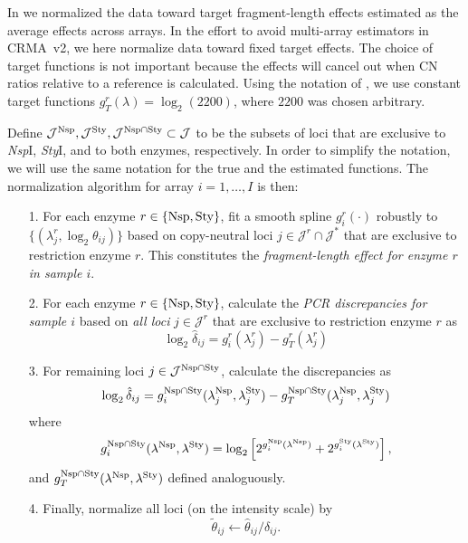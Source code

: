 \documentclass{bioinfo}
\newcommand{\NspI}{\emph{Nsp}I\xspace}
\newcommand{\StyI}{\emph{Sty}I\xspace}
\newcommand{\Nsp}{\ensuremath{\textnormal{Nsp}}\xspace}
\newcommand{\Sty}{\ensuremath{\textnormal{Sty}}\xspace}
\begin{document}
In \citet{BengtssonH_etal_2008a} we normalized the data toward target fragment-length effects estimated as the average effects across arrays.  
In the effort to avoid multi-array estimators in CRMA~v2, we here normalize data toward fixed target effects.  
The choice of target functions is not important because the effects will cancel out when CN ratios relative to a reference is calculated.
Using the notation of \citet{BengtssonH_etal_2008a}, we use constant target functions $g_T^r(\lambda) = \log_2(2200)$, where $2200$ was chosen arbitrary.

Define $\mathcal{J}^{\Nsp}, \mathcal{J}^{\Sty}, \mathcal{J}^{\Nsp\cap\Sty} \subset \mathcal{J}$ to be the subsets of loci that are exclusive to \NspI, \StyI, and to both enzymes, respectively.
In order to simplify the notation, we will use the same notation for the true and the estimated functions.  The normalization algorithm for array $i=1,\ldots,I$ is then:
\begin{enumerate}
 \item[1.] For each enzyme $r \in \{\Nsp, \Sty\}$, fit a smooth spline $g^{r}_{i}(\cdot)$ robustly to $\{(\lambda^{r}_{j}, \log_2\theta_{ij})\}$ based on copy-neutral loci $j \in \mathcal{J}^{r} \cap \mathcal{J^*}$ that are exclusive to restriction enzyme $r$.  This constitutes the \emph{fragment-length effect for enzyme $r$ in sample $i$}.

 \item[2.] For each enzyme $r \in \{\Nsp, \Sty\}$, calculate the \emph{PCR discrepancies for sample $i$} based on \emph{all loci} $j \in \mathcal{J}^{r}$ that are exclusive to restriction enzyme $r$ as
  \begin{equation}
    \log_2 \hat{\delta}_{ij} 
     = g^{r}_{i}(\lambda^{r}_{j}) - g^{r}_{T}(\lambda^{r}_{j})
    \label{eqnPCRbias}
  \end{equation}

 \item[3.] For remaining loci $j \in \mathcal{J}^{\Nsp\cap\Sty}$, calculate the discrepancies as
  \begin{equation}
    \log_2 \hat{\delta}_{ij} 
     = g^{\Nsp\cap\Sty}_{i}(\lambda^{\Nsp}_{j}, \lambda^{\Sty}_{j}) - g^{\Nsp\cap\Sty}_{T}(\lambda^{\Nsp}_{j}, \lambda^{\Sty}_{j})
    \label{eqnPCRbiasIIIa}
  \end{equation}
  where
  \begin{equation}
    g^{\Nsp\cap\Sty}_{i}(\lambda^{\Nsp}, \lambda^{\Sty}) = \log_2\left[
      2^{g^{\Nsp}_{i}(\lambda^{\Nsp})} + 2^{g^{\Sty}_{i}(\lambda^{\Sty})}
    \right],
    \label{eqnPCRbiasIIIb}
  \end{equation}
  and $g^{\Nsp\cap\Sty}_{T}(\lambda^{\Nsp}, \lambda^{\Sty})$ defined analoguously.


 \item[4.] Finally, normalize all loci (on the intensity scale) by
  \begin{equation}
    \tilde{\theta}_{ij} \leftarrow \hat\theta_{ij} / \hat{\delta}_{ij}.
    \label{eqnPCRnorm}
  \end{equation}
\end{enumerate}
\end{document}
